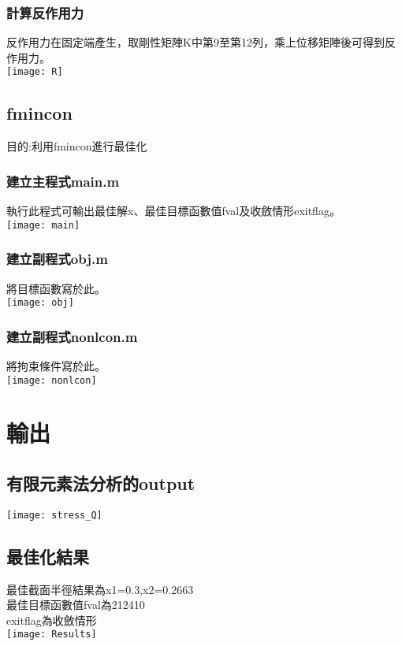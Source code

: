 \documentclass[12pt]{article}
\begin{document}
\begin{CJK}{UTF8}{bsmi}
        \subsubsection{計算反作用力}反作用力在固定端產生，取剛性矩陣K中第9至第12列，乘上位移矩陣後可得到反作用力。\\\texttt{[image: R]}
        
        
    
    \subsection{fmincon}
        目的:利用fmincon進行最佳化
        \subsubsection{建立主程式main.m}
            執行此程式可輸出最佳解x、最佳目標函數值fval及收斂情形exitflag。\\\texttt{[image: main]}
        \subsubsection{建立副程式obj.m}
            將目標函數寫於此。\\\texttt{[image: obj]}
        \subsubsection{建立副程式nonlcon.m}
            將拘束條件寫於此。\\\texttt{[image: nonlcon]}
            
            
            
\section{輸出}
	\subsection{有限元素法分析的output}
	\texttt{[image: stress\_Q]}\\
	\subsection{最佳化結果}
	最佳截面半徑結果為x1=0.3,x2=0.2663\\
	最佳目標函數值fval為212410\\
	exitflag為收斂情形\\
	\texttt{[image: Results]}



\end{CJK}
\end{document}
